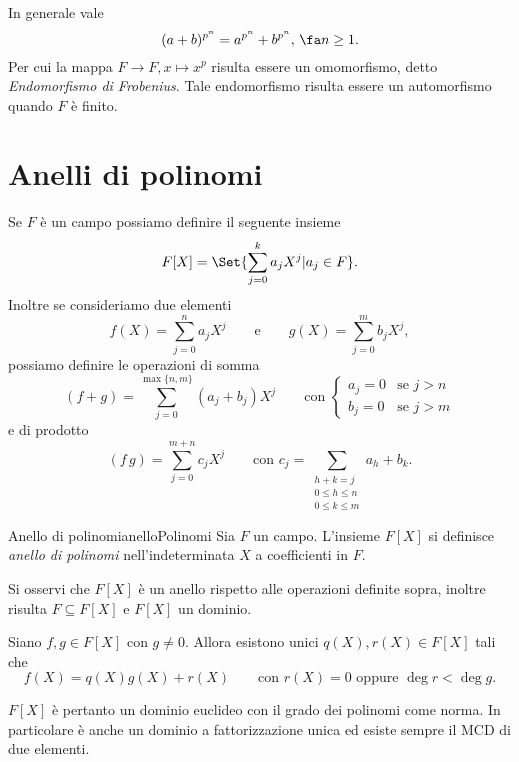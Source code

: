 \begin{oss}
	In generale vale
	\[
		(a+b)^{p^n} = a^{p^n}+b^{p^n},\,\fa n\ge 1.
	\]
	Per cui la mappa \(F\to F, x \mapsto x^p\) risulta essere un omomorfismo, detto \emph{Endomorfismo di Frobenius}.
	Tale endomorfismo risulta essere un automorfismo quando \(F\) è finito.
\end{oss}
\section{Anelli di polinomi}

Se \(F\) è un campo possiamo definire il seguente insieme
\[
	F[X] = \Set{\sum_{j=0}^k a_j X^j | a_j\in F}.
\]
Inoltre se consideriamo due elementi
\[
	f(X) = \sum_{j=0}^n a_j X^j \qquad\text{e}\qquad g(X) = \sum_{j=0}^m b_j X^j,
\]
possiamo definire le operazioni di somma
\[
	(f+g) = \sum_{j=0}^{\max\{n,m\}}(a_j+b_j)X^j \qquad\text{con }\begin{cases}a_j=0 & \text{se }j>n\\b_j=0 & \text{se }j>m\end{cases}
\]
e di prodotto
\[
	(f\,g) = \sum_{j=0}^{m+n} c_j X^j \qquad\text{con }c_j = \sum_{\substack{h+k=j\\0\le h\le n\\0\le k\le m}} a_h + b_k.
\]

\begin{defn}{Anello di polinomi}{anelloPolinomi}
	Sia \(F\) un campo. L'insieme \(F[X]\) si definisce \emph{anello di polinomi} nell'indeterminata \(X\) a coefficienti in \(F\).
\end{defn}

\begin{oss}
	Si osservi che \(F[X]\) è un anello rispetto alle operazioni definite sopra, inoltre risulta \(F\subseteq F[X]\) e \(F[X]\) un dominio.
\end{oss}

\begin{pr}
	Siano \(f,g\in F[X]\) con \(g\neq 0\).
	Allora esistono unici \(q(X),r(X)\in F[X]\) tali che
	\[
		f(X) = q(X)g(X) + r(X) \qquad\text{con }r(X)=0 \text{ oppure }\deg r< \deg g.
	\]
\end{pr}

\begin{oss}
	\(F[X]\) è pertanto un dominio euclideo con il grado dei polinomi come norma.
	In particolare è anche un dominio a fattorizzazione unica ed esiste sempre il MCD di due elementi.
\end{oss}


